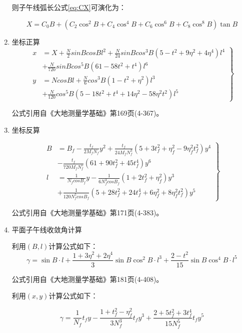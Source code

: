\begin{enumerate}
则子午线弧长公式\ref{eq:CX}可演化为：

\begin{equation}
	\label{eq:CXX}
	X=C_0 B + (C_2 \cos^2 B + C_4 \cos^4 B + C_6 \cos^6 B + C_8 \cos^8 B) \tan B
\end{equation}


\item 坐标正算
\begin{equation}
\left .
\begin{aligned}
x&=X+\frac{N}{2}sinBcosBl^2 +\frac{N}{24}sinBcos^3B(5-t^2 +9\eta^2+4\eta^4)l^4 \\
  &+\frac{N}{720}sinBcos^5 B(61-58t^2 +t^4)l^6  \\
y&=NcosBl+\frac{N}{6}cos^3 B(1-t^2 +\eta^2 )l^3 \\
        &+\frac{N}{120}cos^5 B (5-18t^2+t^4 +14\eta^2 -58\eta^2t^2)l^5
\end{aligned}
 \right \}
\end{equation}

公式引用自《大地测量学基础》第169页(4-367)。

\item 坐标反算

\begin{equation}
\left  .
\begin{aligned}
B&=B_f - \frac{t_f}{2M_f N_f }y^2 +\frac{t_f}{24 M_f N_f ^3}
(5 + 3t_f ^2  + \eta_f ^2 - 9\eta_f ^2 t_f^2)y^4 \\
 &- \frac{t_f}{720 M_f N_f ^5}(61 + 90t_f ^2 + 45t_f ^4)y^6 \\
l&=\frac{1}{N_f cosB_f}y - \frac{1}{6N_f ^3 cosB_f}(1 + 2t_f ^2 + \eta_f ^2)y^3  \\
 &+ \frac{1}{120N_f ^5 cosB_f}(5 + 28t_f ^2 + 24t_f ^4 + 6\eta_f ^2 +8\eta_f ^2 t_f ^2)y^5
\end{aligned} 
\right \}
\end{equation}

公式引用自《大地测量学基础》第171页(4-383)。


\item 平面子午线收敛角计算

利用$(B, l)$计算公式如下：
$$\gamma = \sin B \cdot l + \frac{1 + 3 \eta^2 + 2 \eta^4}{3} \sin B \cos ^2 B \cdot l^3
+ \frac{2 - t^2}{15}\sin B \cos ^4 B \cdot l^5$$

公式引用自《大地测量学基础》第181页(4-408)。

利用$(x, y)$计算公式如下：

$$\gamma = \frac{1}{N_f}t_f y - \frac{1+t_f ^2 - \eta_f ^2}{3N_f ^3}t_f y^3
+ \frac{2+5t_f^2+3t_f^4}{15N_f ^5}t_fy^5$$


\end{enumerate}
